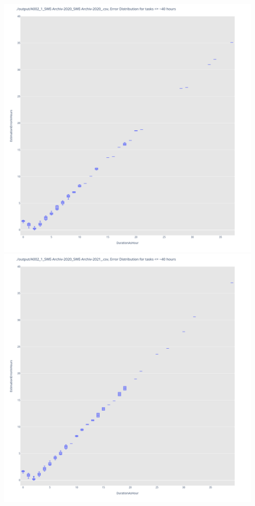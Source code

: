 \includegraphics[width=\textwidth]{Scripts/output/A002_1_SWE-Archiv-2020_SWE-Archiv-2020_.csv.error_distribution.png}
\includegraphics[width=\textwidth]{Scripts/output/A002_1_SWE-Archiv-2020_SWE-Archiv-2021_.csv.error_distribution.png}
